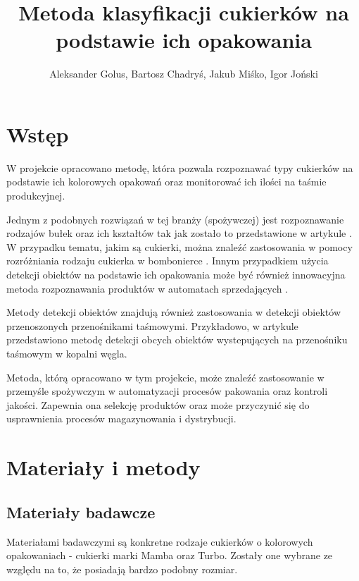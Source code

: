 \documentclass{article}
\title{Metoda klasyfikacji cukierków na podstawie ich opakowania}
\author{Aleksander Golus, Bartosz Chadryś, Jakub Miśko, Igor Joński}
\begin{document}
\maketitle

\newpage


\section{Wstęp}
\label{Wstęp}
W projekcie opracowano metodę, która pozwala rozpoznawać typy cukierków na podstawie ich kolorowych opakowań oraz monitorować ich ilości na taśmie produkcyjnej.

Jednym z podobnych rozwiązań w tej branży (spożywczej) jest rozpoznawanie rodzajów bułek oraz ich kształtów tak jak zostało to przedstawione w artykule \cite{virtuslab}. W przypadku tematu, jakim są cukierki, można znaleźć zastosowania w pomocy rozróżniania rodzaju cukierka w bombonierce \cite{chocolates}. Innym przypadkiem użycia detekcji obiektów na podstawie ich opakowania może być również innowacyjna metoda rozpoznawania produktów w automatach sprzedających \cite{vending}.

Metody detekcji obiektów znajdują również zastosowania w detekcji obiektów przenoszonych przenośnikami taśmowymi. Przykładowo, w artykule \cite{coalForeign} przedstawiono metodę detekcji obcych obiektów wystepujących na przenośniku taśmowym w kopalni węgla.

Metoda, którą opracowano w tym projekcie, może znaleźć zastosowanie w przemyśle spożywczym w automatyzacji procesów pakowania oraz kontroli jakości. Zapewnia ona selekcję produktów oraz może przyczynić się do usprawnienia procesów magazynowania i dystrybucji.

\section{Materiały i metody}
\label{Materiały i metody}
\subsection{Materiały badawcze}
\label{Materiały badawcze}
Materiałami badawczymi są konkretne rodzaje cukierków o kolorowych opakowaniach - cukierki marki Mamba oraz Turbo. Zostały one wybrane ze względu na to, że posiadają bardzo podobny rozmiar.
\end{document}
